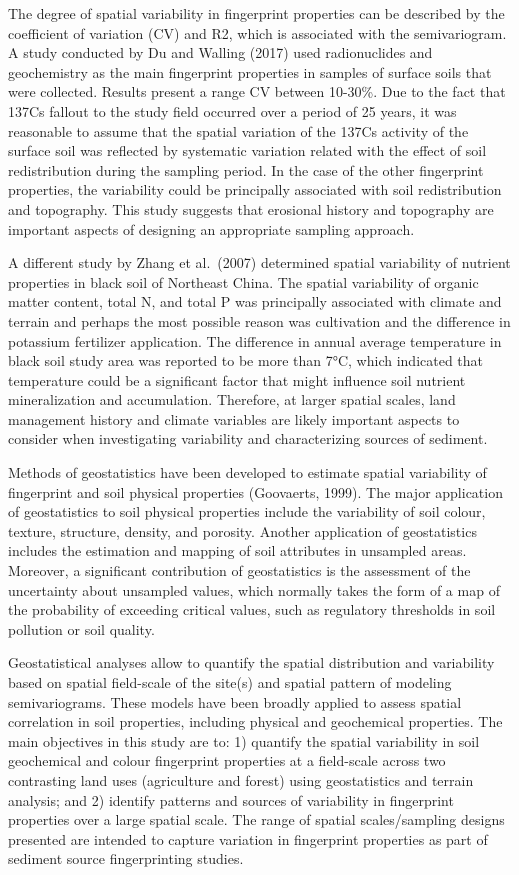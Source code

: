 \documentclass[
  number]{elsarticle}
\begin{document}
The degree of spatial variability in fingerprint properties can be
described by the coefficient of variation (CV) and R2, which is
associated with the semivariogram. A study conducted by Du and Walling
(2017) used radionuclides and geochemistry as the main fingerprint
properties in samples of surface soils that were collected. Results
present a range CV between 10-30\%. Due to the fact that 137Cs fallout
to the study field occurred over a period of 25 years, it was reasonable
to assume that the spatial variation of the 137Cs activity of the
surface soil was reflected by systematic variation related with the
effect of soil redistribution during the sampling period. In the case of
the other fingerprint properties, the variability could be principally
associated with soil redistribution and topography. This study suggests
that erosional history and topography are important aspects of designing
an appropriate sampling approach.

A different study by Zhang et al.~(2007) determined spatial variability
of nutrient properties in black soil of Northeast China. The spatial
variability of organic matter content, total N, and total P was
principally associated with climate and terrain and perhaps the most
possible reason was cultivation and the difference in potassium
fertilizer application. The difference in annual average temperature in
black soil study area was reported to be more than 7°C, which indicated
that temperature could be a significant factor that might influence soil
nutrient mineralization and accumulation. Therefore, at larger spatial
scales, land management history and climate variables are likely
important aspects to consider when investigating variability and
characterizing sources of sediment.

Methods of geostatistics have been developed to estimate spatial
variability of fingerprint and soil physical properties (Goovaerts,
1999). The major application of geostatistics to soil physical
properties include the variability of soil colour, texture, structure,
density, and porosity. Another application of geostatistics includes the
estimation and mapping of soil attributes in unsampled areas. Moreover,
a significant contribution of geostatistics is the assessment of the
uncertainty about unsampled values, which normally takes the form of a
map of the probability of exceeding critical values, such as regulatory
thresholds in soil pollution or soil quality.

Geostatistical analyses allow to quantify the spatial distribution and
variability based on spatial field-scale of the site(s) and spatial
pattern of modeling semivariograms. These models have been broadly
applied to assess spatial correlation in soil properties, including
physical and geochemical properties. The main objectives in this study
are to: 1) quantify the spatial variability in soil geochemical and
colour fingerprint properties at a field-scale across two contrasting
land uses (agriculture and forest) using geostatistics and terrain
analysis; and 2) identify patterns and sources of variability in
fingerprint properties over a large spatial scale. The range of spatial
scales/sampling designs presented are intended to capture variation in
fingerprint properties as part of sediment source fingerprinting
studies.
\end{document}
